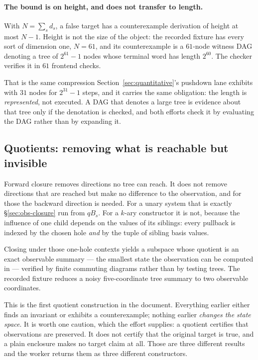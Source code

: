 \paragraph{The bound is on height, and does not transfer to length.} With
$N=\sum_s d_s$, a false target has a counterexample derivation of height at
most $N-1$. Height is not the size of the object: the recorded
 fixture has every sort of dimension one, $N=61$, and its
counterexample is a $61$-node witness DAG denoting a tree of $2^{61}-1$ nodes
whose terminal word has length $2^{60}$. The checker verifies it in $61$
frontend checks.

That is the same compression Section~\ref{sec:quantitative}'s pushdown lane
exhibits with $31$ nodes for $2^{31}-1$ steps, and it carries the same
obligation: the length is \emph{represented}, not executed. A DAG that denotes
a large tree is evidence about that tree only if the denotation is checked, and
both efforts check it by evaluating the DAG rather than by expanding it.

\subsection{Quotients: removing what is reachable but invisible}
\label{sec:quotient}

Forward closure removes directions no tree can reach. It does not remove
directions that are reached but make no difference to the observation, and for
those the backward direction is needed. For a unary system that is exactly
\S\ref{sec:obs-closure} run from $qB_s$. For a $k$-ary constructor it is not,
because the influence of one child depends on the values of its siblings: every
pullback is indexed by the chosen hole \emph{and} by the tuple of sibling basis
values.

Closing under those one-hole contexts yields a subspace whose quotient is an
exact observable summary --- the smallest state the observation can be computed
in --- verified by finite commuting diagrams rather than by testing trees. The
recorded fixture reduces a noisy five-coordinate tree summary to two observable
coordinates.

This is the first quotient construction in the document. Everything earlier
either finds an invariant or exhibits a counterexample; nothing earlier
\emph{changes the state space}. It is worth one caution, which the effort
supplies: a quotient certifies that observations are preserved. It does not
certify that the original target is true, and a plain enclosure makes no target
claim at all. Those are three different results and the worker returns them as
three different constructors.
